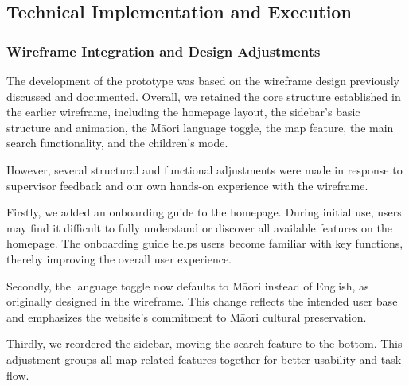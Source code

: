﻿%



\subsection{Technical Implementation and Execution}

\subsubsection{Wireframe Integration and Design Adjustments}

The development of the prototype was based on the wireframe design previously discussed and documented. Overall, we retained the core structure established in the earlier wireframe, including the homepage layout, the sidebar’s basic structure and animation, the Māori language toggle, the map feature, the main search functionality, and the children’s mode.

However, several structural and functional adjustments were made in response to supervisor feedback and our own hands-on experience with the wireframe.

Firstly, we added an onboarding guide to the homepage. During initial use, users may find it difficult to fully understand or discover all available features on the homepage. The onboarding guide helps users become familiar with key functions, thereby improving the overall user experience.

Secondly, the language toggle now defaults to Māori instead of English, as originally designed in the wireframe. This change reflects the intended user base and emphasizes the website’s commitment to Māori cultural preservation.

Thirdly, we reordered the sidebar, moving the search feature to the bottom. This adjustment groups all map-related features together for better usability and task flow.

